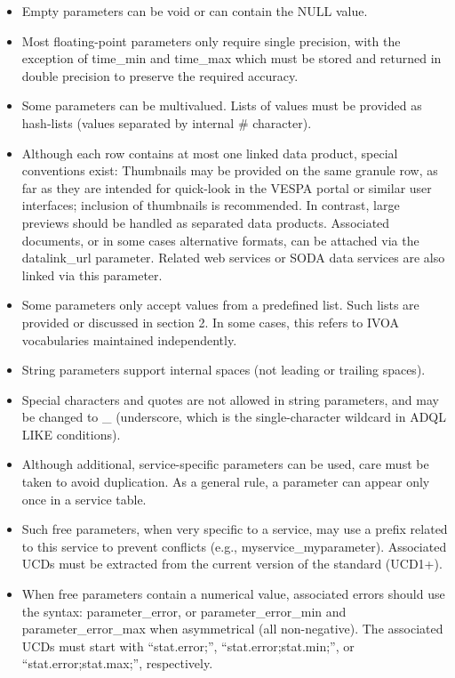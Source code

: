 \documentclass[11pt,a4paper]{ivoa}
\begin{document}
\begin{itemize}
\begin{itemize}
\item Empty parameters can be void or can contain the NULL value.

\item Most floating-point parameters only require single precision,
with the exception of time\_min and time\_max which must be stored and
returned in double precision to preserve the required accuracy.

\item Some parameters can be multivalued. Lists of values must be provided
as hash-lists (values separated by internal \# character).

\item Although each row contains at most one linked data product, special
conventions exist:
Thumbnails may be provided on the same granule row,
as far as they are intended for quick-look in the VESPA portal or
similar user interfaces; inclusion of thumbnails is recommended.
In contrast, large previews should be handled as separated data products.
Associated documents, or in some cases alternative formats, can be
attached via the datalink\_url parameter. Related web services or SODA
data services are also linked via this parameter.

\item Some parameters only accept values from a predefined list. Such
lists are provided or discussed in section 2. In some cases, this refers
to IVOA vocabularies maintained independently.

\item String parameters support internal spaces
(not leading or trailing spaces).

\item Special characters and quotes are not allowed in string parameters,
and may be changed to \_ (underscore, which is the single-character
wildcard in ADQL LIKE conditions).

\item Although additional, service-specific parameters can be used,
care must be taken to avoid duplication. As a general rule, a parameter
can appear only once in a service table.

\item Such free parameters, when very specific to a service,
may use a prefix related to this service to prevent conflicts
(e.g., myservice\_myparameter).
Associated UCDs must be extracted from the
current version of the standard (UCD1+).

\item When free parameters contain a numerical value, associated errors
should use the syntax: parameter\_error, or parameter\_error\_min
and parameter\_error\_max when asymmetrical (all non-negative). The
associated UCDs must start with ``stat.error;'', ``stat.error;stat.min;'',
or ``stat.error;stat.max;'', respectively.
\end{itemize}


\end{itemize}
\end{document}
